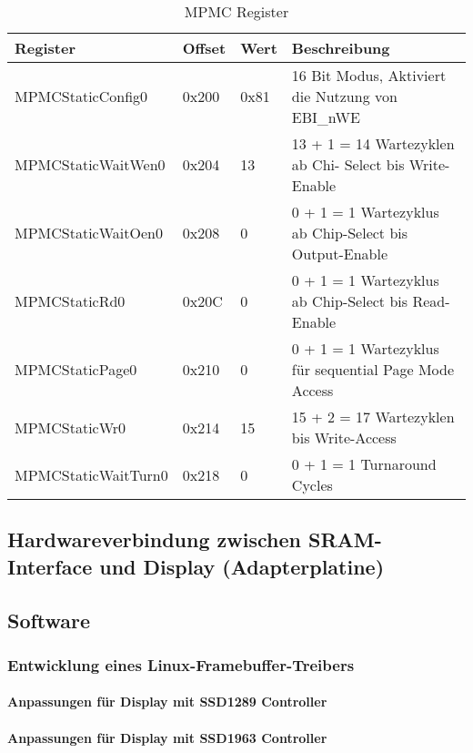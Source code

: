 \begin{table}[h]
\begin{tabular}{|p{4cm}|p{1cm}|p{1cm}|p{6.6cm}|}\hline
	\textbf{Register} 	& \textbf{Offset} 	& \textbf{Wert} & \textbf{Beschreibung} 							\\ \hline
	MPMCStaticConfig0 	& 0x200 		& 0x81 			& 16 Bit Modus, Aktiviert die Nutzung von EBI\_nWE 	\\ \hline
	MPMCStaticWaitWen0 	& 0x204 		& 13 			& 13 + 1 = 14 Wartezyklen ab Chi- Select bis Write-Enable 	\\ \hline
	MPMCStaticWaitOen0 	& 0x208 		& 0 			& 0 + 1 = 1 Wartezyklus ab Chip-Select bis Output-Enable  												\\ \hline
	MPMCStaticRd0 		& 0x20C 		& 0 			& 0 + 1 = 1 Wartezyklus ab Chip-Select bis Read-Enable					\\ \hline
	MPMCStaticPage0 	& 0x210 		& 0 			& 0 + 1 = 1 Wartezyklus für sequential Page Mode Access												\\ \hline
	MPMCStaticWr0 		& 0x214 		& 15 			& 15 + 2  = 17 Wartezyklen bis Write-Access	\\ \hline
	MPMCStaticWaitTurn0 & 0x218 		& 0 			& 0 + 1 = 1 Turnaround Cycles 								\\ \hline
\end{tabular}
\caption{MPMC Register}
\label{tab:mpmc_config}
\end{table}


\subsection{Hardwareverbindung zwischen SRAM-Interface und Display (Adapterplatine)}

\subsection{Software}
\subsubsection{Entwicklung eines Linux-Framebuffer-Treibers}
\paragraph{Anpassungen für Display mit SSD1289 Controller}
\paragraph{Anpassungen für Display mit SSD1963 Controller}
